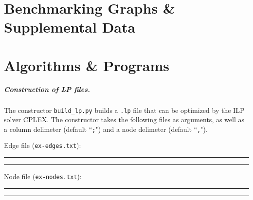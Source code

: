 \documentclass[12pt,twoside]{reedthesis}
\theoremstyle{definition}
\begin{document}
    \appendix
      \chapter{Benchmarking Graphs \& Supplemental Data}

      \chapter{Algorithms \& Programs}

        \paragraph{Construction of LP files.}The constructor \verb|build_lp.py| builds a \texttt{.lp} file that can be optimized by the ILP solver CPLEX. The constructor takes the following files as arguments, as well as a column delimeter (default ``\texttt{;}") and a node delimeter (default ``\texttt{,}").

        Edge file (\texttt{ex-edges.txt}):\\
        \rule{\textwidth}{1pt}
        
        \rule{\textwidth}{1pt}

        \newpage

        Node file (\texttt{ex-nodes.txt}):\\
        \rule{\textwidth}{1pt}
        
        \rule{\textwidth}{1pt}

        \newpage
\end{document}
